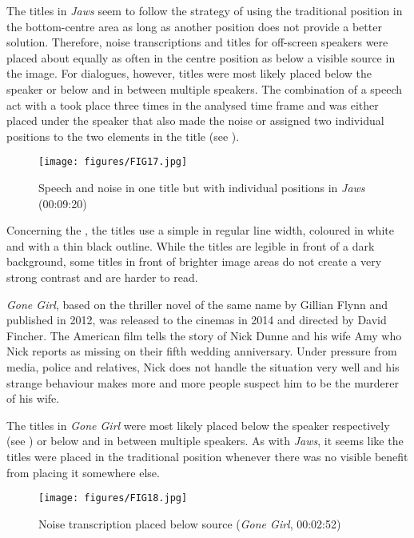 The titles in \textit{Jaws} seem to follow the strategy of using the traditional position in the bottom-centre area as long as another position does not provide a better solution. Therefore, noise transcriptions and titles for off-screen speakers were placed about equally as often in the centre position as below a visible source in the image. For dialogues, however, titles were most likely placed below the speaker or below and in between multiple speakers. The combination of a speech act with a  took place three times in the analysed time frame and was either placed under the speaker that also made the noise or assigned two individual positions to the two elements in the title (see ).

\begin{figure}
\texttt{[image: figures/FIG17.jpg]}
\caption{Speech and noise in one title but with individual positions in \textit{Jaws} (00:09:20)}
\label{fig:FIG17}
\end{figure}

\largerpage
Concerning the , the titles use a simple   in regular line width, coloured in white and with a thin black outline. While the titles are legible in front of a dark background, some titles in front of brighter image areas do not create a very strong contrast and are harder to read.

\textit{Gone Girl}, based on the thriller novel of the same name by Gillian Flynn and published in 2012, was released to the cinemas in 2014 and directed by David Fincher. The American film tells the story of Nick Dunne and his wife Amy who Nick reports as missing on their fifth wedding anniversary. Under pressure from media, police and relatives, Nick does not handle the situation very well and his strange behaviour makes more and more people suspect him to be the murderer of his wife.

The titles in \textit{Gone Girl} were most likely placed below the speaker respectively  (see ) or below and in between multiple speakers. As with \textit{Jaws}, it seems like the titles were placed in the traditional position whenever there was no visible benefit from placing it somewhere else. 

\begin{figure}
\texttt{[image: figures/FIG18.jpg]}
\caption{Noise transcription placed below source (\textit{Gone Girl}, 00:02:52)}
\label{fig:FIG18}
\end{figure}

